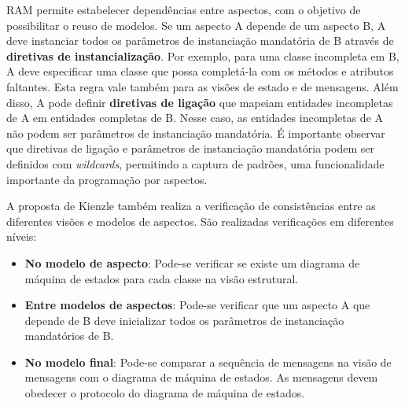 RAM permite estabelecer dependências entre aspectos, com o objetivo de possibilitar o reuso de modelos. Se um aspecto A depende de um aspecto B, A
deve instanciar todos os parâmetros de instanciação mandatória de B através de \textbf{diretivas de instancialização}. Por exemplo, para uma
classe incompleta em B, A deve especificar uma classe que possa completá-la com os métodos e atributos faltantes. Esta regra vale também para as visões de
estado e de mensagens. Além disso, A pode definir \textbf{diretivas de ligação} que mapeiam entidades incompletas de A em entidades completas de B.
Nesse caso, as entidades incompletas de A não podem ser parâmetros de instanciação mandatória. É importante observar que diretivas de ligação e
parâmetros de instanciação mandatória podem ser definidos com \textit{wildcards}, permitindo a captura de padrões, uma funcionalidade
importante da programação por aspectos.

A proposta de Kienzle também realiza a verificação de consistências entre as diferentes visões e modelos de aspectos. São realizadas verificações em
diferentes níveis:

\begin{itemize}
  \item \textbf{No modelo de aspecto}: Pode-se verificar se existe um diagrama de máquina de estados para cada classe na visão estrutural.
  \item \textbf{Entre modelos de aspectos}: Pode-se verificar que um aspecto A que depende de B deve inicializar todos os parâmetros de instanciação
  mandatórios de B.
  \item \textbf{No modelo final}: Pode-se comparar a sequência de mensagens na visão de mensagens com o diagrama de máquina de estados. As mensagens
  devem obedecer o protocolo do diagrama de máquina de estados.
\end{itemize}

